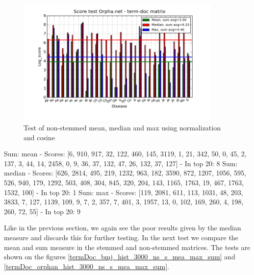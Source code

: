\begin{figure}[h!]
        \begin{center}
          \includegraphics[width=0.9\textwidth]{barcharts/termDoc_orphan_hist_3000_ns_mea_med_max_sum.png}
        \end{center}
        \caption{Test of non-stemmed mean, median and max using normalization and cosine}
        \label{termDoc_orphan_hist_3000_ns_mea_med_max_sum}
\end{figure}
 
Sum: mean - Scores: [6, 910, 917, 32, 122, 460, 145, 3119, 1, 21, 342, 50, 0, 45, 2, 137, 3, 44, 14, 2458, 0, 9, 36, 37, 132, 47, 26, 132, 37, 127] - In top 20: 8
Sum: median - Scores: [626, 2814, 495, 219, 1232, 963, 182, 3590, 872, 1207, 1056, 595, 526, 940, 179, 1292, 503, 408, 304, 845, 320, 204, 143, 1165, 1763, 19, 467, 1763, 1532, 100] - In top 20: 1
Sum: max - Scores: [119, 2081, 611, 113, 1031, 48, 203, 3833, 7, 127, 1139, 109, 9, 7, 2, 357, 7, 401, 3, 1957, 13, 0, 102, 169, 260, 4, 198, 260, 72, 55] - In top 20: 9


Like in the previous section, we again see the poor results given by the median measure and discards this for further testing. In the next test we compare the mean and sum measure in the stemmed and non-stemmed matrices. The tests are shown on the figures \ref{termDoc_bmj_hist_3000_ns_s_mea_max_sum} and \ref{termDoc_orphan_hist_3000_ns_s_mea_max_sum}.

